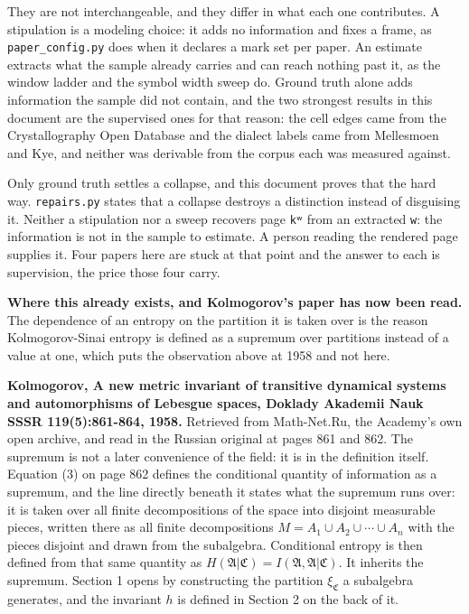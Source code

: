 They are not interchangeable, and they differ in what each one contributes. A stipulation is a modeling choice: it adds no information and fixes a frame, as \texttt{paper\_\allowbreak{}config.\allowbreak{}py} does when it declares a mark set per paper. An estimate extracts what the sample already carries and can reach nothing past it, as the window ladder and the symbol width sweep do. Ground truth alone adds information the sample did not contain, and the two strongest results in this document are the supervised ones for that reason: the cell edges came from the Crystallography Open Database and the dialect labels came from Mellesmoen and Kye, and neither was derivable from the corpus each was measured against.

Only ground truth settles a collapse, and this document proves that the hard way. \texttt{repairs.\allowbreak{}py} states that a collapse destroys a distinction instead of disguising it. Neither a stipulation nor a sweep recovers page \texttt{kʷ} from an extracted \texttt{w}: the information is not in the sample to estimate. A person reading the rendered page supplies it. Four papers here are stuck at that point and the answer to each is supervision, the price those four carry.

\textbf{Where this already exists, and Kolmogorov's paper has now been read.} The dependence of an entropy on the partition it is taken over is the reason Kolmogorov-Sinai entropy is defined as a supremum over partitions instead of a value at one, which puts the observation above at 1958 and not here.

\textbf{Kolmogorov, A new metric invariant of transitive dynamical systems and automorphisms of Lebesgue spaces, Doklady Akademii Nauk SSSR 119(5):861-864, 1958.} Retrieved from Math-Net.Ru, the Academy's own open archive, and read in the Russian original at pages 861 and 862. The supremum is not a later convenience of the field: it is in the definition itself. Equation (3) on page 862 defines the conditional quantity of information as a supremum, and the line directly beneath it states what the supremum runs over: it is taken over all finite decompositions of the space into disjoint measurable pieces, written there as all finite decompositions \(M = A_1 \cup A_2 \cup \cdots \cup A_n\) with the pieces disjoint and drawn from the subalgebra. Conditional entropy is then defined from that same quantity as \(H(\mathfrak{A}|\mathfrak{C}) = I(\mathfrak{A}, \mathfrak{A}|\mathfrak{C})\). It inherits the supremum. Section 1 opens by constructing the partition \(\xi_{\mathfrak{C}}\) a subalgebra generates, and the invariant \(h\) is defined in Section 2 on the back of it.


